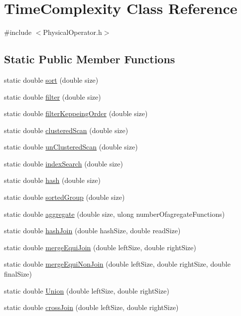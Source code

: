 \hypertarget{class_time_complexity}{\section{Time\+Complexity Class Reference}
\label{class_time_complexity}
}


{\ttfamily \#include $<$Physical\+Operator.\+h$>$}

\subsection*{Static Public Member Functions}
\begin{DoxyCompactItemize}
\item 
static double \hyperlink{class_time_complexity_ab84b18ddf8b7af7725dd0f2d90e8f7ae}{sort} (double size)
\item 
static double \hyperlink{class_time_complexity_ad12440b18c1a3a2924cf6836f0b04c4b}{filter} (double size)
\item 
static double \hyperlink{class_time_complexity_ac3d406914d7421b7ae762edd039cc9fb}{filter\+Keppeing\+Order} (double size)
\item 
static double \hyperlink{class_time_complexity_a26a439592bc7d74dce99ff66fc9c45ed}{clustered\+Scan} (double size)
\item 
static double \hyperlink{class_time_complexity_a9b9a3434b75473198bf7e2c0c4ec2e80}{un\+Clustered\+Scan} (double size)
\item 
static double \hyperlink{class_time_complexity_ae6fc889627b5bd1d513998729e8e2b08}{index\+Search} (double size)
\item 
static double \hyperlink{class_time_complexity_a84061694749a7148d93ea55674c9ecbd}{hash} (double size)
\item 
static double \hyperlink{class_time_complexity_aa8fa3fdb0f32cf1d2753271c0979e8d4}{sorted\+Group} (double size)
\item 
static double \hyperlink{class_time_complexity_aa4e2c865e68c42ff8e2a96883077b13c}{aggregate} (double size, ulong number\+Ofagregate\+Functions)
\item 
static double \hyperlink{class_time_complexity_aba131377ee69b0dca0675cf01b2b8a79}{hash\+Join} (double hash\+Size, double read\+Size)
\item 
static double \hyperlink{class_time_complexity_a01770767aca97b500d1006659ada4599}{merge\+Equi\+Join} (double left\+Size, double right\+Size)
\item 
static double \hyperlink{class_time_complexity_a450314407ba001db82fbdea4f01c1cfc}{merge\+Equi\+Non\+Join} (double left\+Size, double right\+Size, double final\+Size)
\item 
static double \hyperlink{class_time_complexity_a72b8fafa9b22122ef78b68deb09678e1}{Union} (double left\+Size, double right\+Size)
\item 
static double \hyperlink{class_time_complexity_a71665e9569694b0fa375e886d440b959}{cross\+Join} (double left\+Size, double right\+Size)
\end{DoxyCompactItemize}
